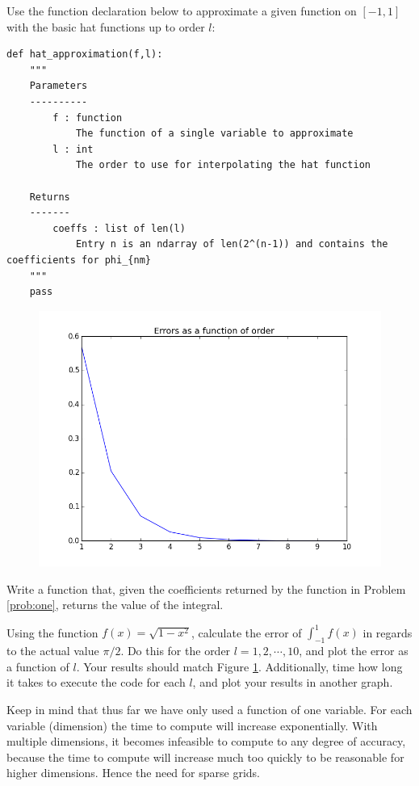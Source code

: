  \begin{problem}
Use the function declaration below to approximate a given function on $[-1,1]$ with the basic hat functions up to order $l$:
\begin{lstlisting}
def hat_approximation(f,l):
    """
    Parameters
    ----------
        f : function
            The function of a single variable to approximate
        l : int
            The order to use for interpolating the hat function

    Returns
    -------
        coeffs : list of len(l)
            Entry n is an ndarray of len(2^(n-1)) and contains the coefficients for phi_{nm}
    """
    pass
\end{lstlisting}
\label{prob:one}
\end{problem}


\begin{center}
\begin{figure}
\includegraphics[width=.7\textwidth]{errors.png}
\caption{}
\label{fig:errors}
\end{figure}
\end{center}

\begin{problem}
Write a function that, given the coefficients returned by the function in Problem \ref{prob:one}, returns the value of the integral.

Using the function $f(x)=\sqrt{1-x^2}$, calculate the error of $\int_{-1}^1 f(x)$ in regards to the actual value $\pi/2$.  Do this for the order $l = 1,2,\cdots,10$, and plot the error as a function of $l$.  Your results should match Figure \ref{fig:errors}.  Additionally, time how long it takes to execute the code for each $l$, and plot your results in another graph.
\end{problem}

Keep in mind that thus far we have only used a function of one variable.  For each variable (dimension) the time to compute will increase exponentially.   With multiple dimensions, it becomes infeasible to compute to any degree of accuracy, because the time to compute will increase much too quickly to be reasonable for higher dimensions.  Hence the need for sparse grids.

